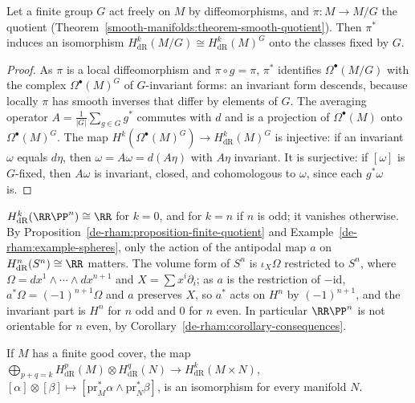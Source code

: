 \begin{proposition}\label{de-rham:proposition-finite-quotient}
Let a finite group $G$ act freely on $M$ by diffeomorphisms, and $\pi \colon M \to M/G$ the quotient (Theorem~\ref{smooth-manifolds:theorem-smooth-quotient}). Then $\pi^*$ induces an isomorphism
$H^k_{\mathrm{dR}}(M/G) \cong H^k_{\mathrm{dR}}(M)^G$ onto the classes fixed by $G$.
\end{proposition}

\begin{proof}
As $\pi$ is a local diffeomorphism and $\pi \circ g = \pi$, $\pi^*$ identifies $\Omega^\bullet(M/G)$ with the complex $\Omega^\bullet(M)^G$ of $G$-invariant forms: an invariant form descends, because locally $\pi$ has smooth inverses that differ
by elements of $G$. The averaging operator $A = \frac{1}{|G|}\sum_{g \in G}g^*$ commutes with $d$ and is a projection of $\Omega^\bullet(M)$ onto $\Omega^\bullet(M)^G$. The map $H^k(\Omega^\bullet(M)^G) \to H^k_{\mathrm{dR}}(M)^G$ is injective: if an
invariant $\omega$ equals $d\eta$, then $\omega = A\omega = d(A\eta)$ with $A\eta$ invariant. It is surjective: if $[\omega]$ is $G$-fixed, then $A\omega$ is invariant, closed, and cohomologous to $\omega$, since each $g^*\omega$ is.
\end{proof}

\begin{example}\label{de-rham:example-real-projective}
$H^k_{\mathrm{dR}}(\RR\PP^n) \cong \RR$ for $k = 0$, and for $k = n$ if $n$ is odd; it vanishes otherwise. By Proposition~\ref{de-rham:proposition-finite-quotient} and Example~\ref{de-rham:example-spheres}, only the action of the
antipodal map $a$ on $H^n_{\mathrm{dR}}(S^n) \cong \RR$ matters. The volume form of $S^n$ is $\iota_X\Omega$ restricted to $S^n$, where $\Omega = dx^1 \wedge \cdots \wedge dx^{n+1}$ and $X = \sum x^i\partial_i$; as $a$ is the restriction of $-\mathrm{id}$,
$a^*\Omega = (-1)^{n+1}\Omega$ and $a$ preserves $X$, so $a^*$ acts on $H^n$ by $(-1)^{n+1}$, and the invariant part is $H^n$ for $n$ odd and $0$ for $n$ even. In particular $\RR\PP^n$ is not orientable for $n$ even, by
Corollary~\ref{de-rham:corollary-consequences}.
\end{example}

\begin{theorem}\label{de-rham:theorem-kunneth}
If $M$ has a finite good cover, the map $\bigoplus_{p+q=k}H^p_{\mathrm{dR}}(M) \otimes H^q_{\mathrm{dR}}(N) \to H^k_{\mathrm{dR}}(M \times N)$, $[\alpha] \otimes [\beta] \mapsto [\mathrm{pr}_M^*\alpha \wedge \mathrm{pr}_N^*\beta]$, is an isomorphism for every
manifold $N$.
\end{theorem}

